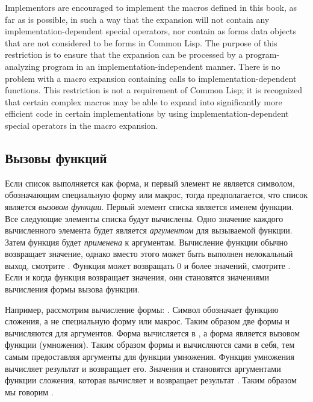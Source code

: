 \beforenoterule
\begin{implementation}
Implementors are encouraged to implement the macros
defined in this book, as far as is possible, in such a way that
the expansion will not contain any implementation-dependent
special operators, nor contain as forms data objects that
are not considered to be forms in Common Lisp.
The purpose of this restriction is to ensure that the expansion
can be processed by a program-analyzing program in an
implementation-independent manner.
There is no problem with a macro expansion containing
calls to implementation-dependent functions.
This restriction is not a requirement of Common Lisp; it is recognized
that certain complex macros may be able to expand into significantly
more efficient code in certain implementations
by using implementation-dependent special operators in the macro expansion.
\end{implementation}
\afternoterule

\subsection{Вызовы функций}

Если список выполняется как форма, и первый элемент не является символом,
обозначающим специальную форму или макрос, тогда предполагается, что список
является \emph{вызовом функции}. Первый элемент списка является именем
функции. Все следующие элементы списка будут вычислены. Одно значение каждого
вычисленного элемента будет является \emph{аргументом} для вызываемой
функции. 
Затем функция будет \emph{применена} к аргументам. Вычисление функции обычно
возвращает значение, однако вместо этого может быть выполнен нелокальный выход,
смотрите . Функция может возвращать 0 и более значений, смотрите
. 
Если и когда функция возвращает значения, они становятся значениями вычисления
формы вызова функции.

Например, рассмотрим вычисление формы: .
Символ \cdf{+} обозначает функцию сложения, а не специальную форму или макрос.
Таким образом две формы  и  вычисляются для аргументов. Форма
 вычисляется в , а форма  является вызовом функции
(умножения). Таким образом формы  и  вычисляются сами в себя, тем
самым предоставляя аргументы для функции умножения. Функция умножения вычисляет
результат  и возвращает его. Значения  и  становятся
аргументами функции сложения, которая вычисляет и возвращает результат
. Таким образом мы говорим .

